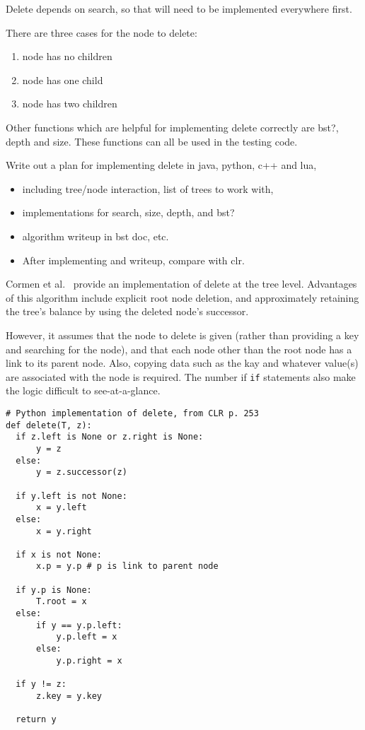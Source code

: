 \documentclass{article}
\begin{document}
Delete depends on search, so that will need to be implemented everywhere first.

There are three cases for the node to delete:

\begin{enumerate}
\item node has no children
\item node has one child
\item node has two children
\end{enumerate}

Other functions which are helpful for implementing delete correctly
are bst?, depth and size. These functions can all be used in the testing
code.

Write out a plan for implementing delete in java, python, c++ and lua,

\begin{itemize}
  \item including tree/node interaction, list of trees to work with,
  \item implementations for search, size, depth, and bst?
  \item algorithm writeup in bst doc, etc.
  \item After implementing and writeup, compare with clr.
\end{itemize}

Cormen et al.~\cite[p. 253]{cormen:th:1990} provide an implementation of
delete at the tree level. Advantages of this algorithm include explicit root node
deletion, and approximately retaining the tree's balance by using the deleted
node's successor.

However, it assumes that the node to delete is
given (rather than providing a key and searching for the node), and that
each node other than the root node has a link to its parent node.
Also, copying data such as the kay and whatever value(s) are associated
with the node is required. The number if {\tt if} statements also make
the logic difficult to see-at-a-glance.

\begin{lstlisting}[frame=single]
# Python implementation of delete, from CLR p. 253
def delete(T, z):
  if z.left is None or z.right is None:
      y = z
  else:
      y = z.successor(z)

  if y.left is not None:
      x = y.left
  else:
      x = y.right

  if x is not None:
      x.p = y.p # p is link to parent node

  if y.p is None:
      T.root = x
  else:
      if y == y.p.left:
          y.p.left = x
      else:
          y.p.right = x

  if y != z:
      z.key = y.key

  return y
\end{lstlisting}
\end{document}

